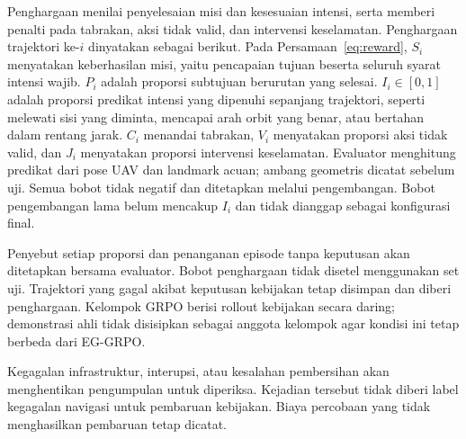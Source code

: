 Penghargaan menilai penyelesaian misi dan kesesuaian intensi, serta memberi penalti pada tabrakan, aksi tidak valid, dan intervensi keselamatan. Penghargaan trajektori ke-$i$ dinyatakan sebagai berikut.
Pada Persamaan~\ref{eq:reward}, $S_i$ menyatakan keberhasilan misi, yaitu pencapaian tujuan beserta seluruh syarat intensi wajib. $P_i$ adalah proporsi subtujuan berurutan yang selesai. $I_i\in[0,1]$ adalah proporsi predikat intensi yang dipenuhi sepanjang trajektori, seperti melewati sisi yang diminta, mencapai arah orbit yang benar, atau bertahan dalam rentang jarak. $C_i$ menandai tabrakan, $V_i$ menyatakan proporsi aksi tidak valid, dan $J_i$ menyatakan proporsi intervensi keselamatan. Evaluator menghitung predikat dari pose UAV dan landmark acuan; ambang geometris dicatat sebelum uji. Semua bobot tidak negatif dan ditetapkan melalui pengembangan. Bobot pengembangan lama belum mencakup $I_i$ dan tidak dianggap sebagai konfigurasi final.

Penyebut setiap proporsi dan penanganan episode tanpa keputusan akan ditetapkan bersama evaluator. Bobot penghargaan tidak disetel menggunakan set uji. Trajektori yang gagal akibat keputusan kebijakan tetap disimpan dan diberi penghargaan. Kelompok GRPO berisi rollout kebijakan secara daring; demonstrasi ahli tidak disisipkan sebagai anggota kelompok agar kondisi ini tetap berbeda dari EG-GRPO.

Kegagalan infrastruktur, interupsi, atau kesalahan pembersihan akan menghentikan pengumpulan untuk diperiksa. Kejadian tersebut tidak diberi label kegagalan navigasi untuk pembaruan kebijakan. Biaya percobaan yang tidak menghasilkan pembaruan tetap dicatat.

